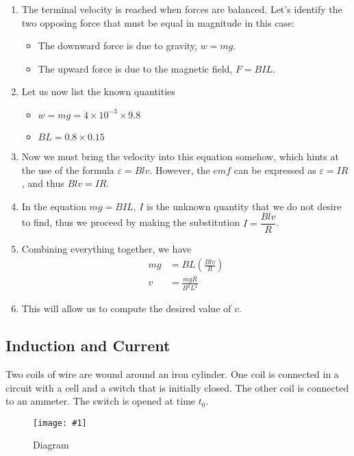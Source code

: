 \documentclass[a4paper,12pt]{article}
\newcommand{\img}[4]{\begin{center}
  \begin{figure}[H]
    \centering
    \texttt{[image: \#1]}
    \caption{#3}
    \label{fig:#4}
  \end{figure}
\end{center}}
\begin{document}
\begin{enumerate}
  \item The terminal velocity is reached when forces are balanced. Let's identify the two opposing force that must be equal in magnitude in this case:
        \begin{itemize}
          \item The downward force is due to gravity, $w = mg$.
          \item The upward force is due to the magnetic field, $F = BIL$.
        \end{itemize}
  \item Let us now list the known quantities
        \begin{itemize}
          \item $w = mg = 4 \times 10^{-3} \times 9.8$
          \item $BL = 0.8 \times 0.15$
        \end{itemize}
  \item Now we must bring the velocity into this equation somehow, which hints at the use of the formula $\varepsilon = Blv$. However, the $emf$ can be expressed as $\varepsilon = IR$, and thus $Blv = IR$.
  \item In the equation $mg = BIL$, $I$ is the unknown quantity that we do not desire to find, thus we proceed by making the substitution $I = \dfrac{Blv}{R}$.
  \item Combining everything together, we have
        \begin{align*}
          mg & = BL(\frac{Blv}{R})  \\
          v  & = \frac{mgR}{B^2L^2}
        \end{align*}
  \item This will allow us to compute the desired value of $v$.
\end{enumerate}

\pagebreak

\subsection{Induction and Current}

Two coils of wire are wound around an iron cylinder. One coil is connected in a circuit with a cell and a switch that is initially closed. The other coil is connected to an ammeter. The switch is opened at time $t_0$.
\img{ex/gencur.png}{0.45}{Diagram}{gencur}
\end{document}
